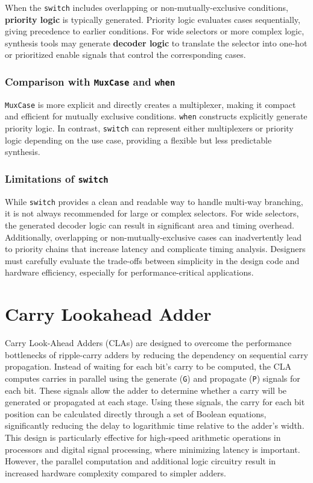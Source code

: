 When the \texttt{switch} includes overlapping or non-mutually-exclusive conditions, \textbf{priority logic} is typically generated. Priority logic evaluates cases sequentially, giving precedence to earlier conditions. For wide selectors or more complex logic, synthesis tools may generate \textbf{decoder logic} to translate the selector into one-hot or prioritized enable signals that control the corresponding cases.

\subsubsection{Comparison with \texttt{MuxCase} and \texttt{when}}
\texttt{MuxCase} is more explicit and directly creates a multiplexer, making it compact and efficient for mutually exclusive conditions. \texttt{when} constructs explicitly generate priority logic. In contrast, \texttt{switch} can represent either multiplexers or priority logic depending on the use case, providing a flexible but less predictable synthesis.

\subsubsection{Limitations of \texttt{switch}}
While \texttt{switch} provides a clean and readable way to handle multi-way branching, it is not always recommended for large or complex selectors. For wide selectors, the generated decoder logic can result in significant area and timing overhead. Additionally, overlapping or non-mutually-exclusive cases can inadvertently lead to priority chains that increase latency and complicate timing analysis. Designers must carefully evaluate the trade-offs between simplicity in the design code and hardware efficiency, especially for performance-critical applications.


\section{Carry Lookahead Adder}
Carry Look-Ahead Adders (CLAs) are designed to overcome the performance bottlenecks of ripple-carry adders by reducing the dependency on sequential carry propagation. Instead of waiting for each bit's carry to be computed, the CLA computes carries in parallel using the generate (\texttt{G}) and propagate (\texttt{P}) signals for each bit. These signals allow the adder to determine whether a carry will be generated or propagated at each stage. Using these signals, the carry for each bit position can be calculated directly through a set of Boolean equations, significantly reducing the delay to logarithmic time relative to the adder's width. This design is particularly effective for high-speed arithmetic operations in processors and digital signal processing, where minimizing latency is important. However, the parallel computation and additional logic circuitry result in increased hardware complexity compared to simpler adders.


